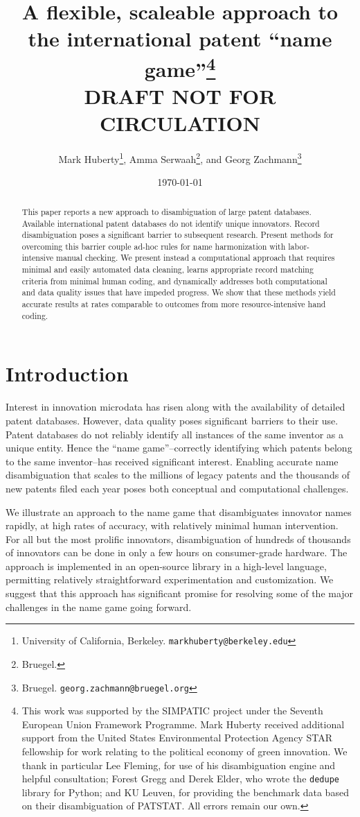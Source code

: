 \documentclass[11pt]{article}
\title{A flexible, scaleable approach to the international patent
  ``name game''\thanks{This
    work was supported by the SIMPATIC project under the Seventh European Union Framework Programme. Mark Huberty received additional support from the United States
    Environmental Protection Agency STAR fellowship for work relating to
    the political economy of green innovation. We thank in particular
    Lee Fleming, for use of his disambiguation engine and helpful consultation; Forest
    Gregg and Derek Elder, who wrote the \texttt{dedupe} library for
    Python; and KU Leuven, for providing the benchmark data based on
    their disambiguation of PATSTAT. All errors remain our own.}\\
  DRAFT NOT FOR CIRCULATION}
\author{Mark Huberty\thanks{University of California,
    Berkeley. \texttt{markhuberty@berkeley.edu}}, Amma
  Serwaah\thanks{Bruegel.}, and Georg Zachmann\thanks{Bruegel. \texttt{georg.zachmann@bruegel.org}}}
\date{\today}
\begin{document}
\maketitle
\doublespacing

\begin{abstract}
  This paper reports a new approach to disambiguation of large patent
databases. Available international patent databases do not identify
unique innovators. Record disambiguation poses a significant barrier
to subsequent research. Present methods for overcoming this barrier
couple ad-hoc rules for name harmonization with labor-intensive manual
checking. We present instead a computational approach that requires
minimal and easily automated data cleaning, learns
appropriate record matching criteria from minimal human coding, and
dynamically addresses both
computational and data quality issues that have impeded progress. We show
that these methods yield accurate results at rates comparable to
outcomes from more resource-intensive hand coding.
\end{abstract}


\section{Introduction}
\label{sec:introduction}

Interest in innovation microdata has risen along with the availability
of detailed patent databases. However, data quality poses significant
barriers to their use. Patent databases do not reliably identify all
instances of the same inventor as a unique entity. Hence the ``name
game''--correctly identifying which patents belong to the same
inventor--has received significant interest. Enabling accurate name
disambiguation that scales to the millions of legacy patents and the
thousands of new patents filed each year poses both conceptual and
computational challenges. 

We illustrate an approach to the name game that disambiguates
innovator names rapidly, at high rates of accuracy, with relatively
minimal human intervention. For all but the most prolific innovators,
disambiguation of hundreds of thousands of innovators can be done in
only a few hours on consumer-grade hardware. The approach is
implemented in an open-source library in a high-level language,
permitting relatively straightforward experimentation and
customization. We suggest that this approach has significant promise
for resolving some of the major challenges in the name game going
forward.
\end{document}
